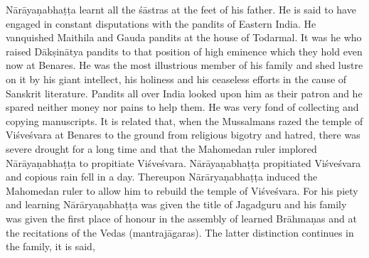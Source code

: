 \documentclass[11pt, openany]{book}
\begin{document}
Nārāyaṇabhaṭṭa learnt all the śāstras at the feet of his father. He is said to have engaged in constant disputations with the pandits of Eastern India. He vanquished Maithila and Gauda pandits at the house of Todarmal. It was he who raised Dākṣinātya pandits to that position of high eminence which they hold even now at Benares. He was the most illustrious member of his family and shed lustre on it by his giant intellect, his holiness and his ceaseless efforts in the cause of Sanskrit literature. Pandits all over India looked upon him as their patron and he spared neither money nor pains to help them. He was very fond of collecting and copying manuscripts. It is related that, when the Mussalmans razed the temple of Viśveśvara at Benares to the ground from religious bigotry and hatred, there was severe drought for a long time and that the Mahomedan ruler implored Nārāyaṇabhaṭṭa to propitiate Viśveśvara. Nārāyaṇabhaṭṭa propitiated Viśveśvara and copious rain fell in a day. Thereupon Nārāryaṇabhaṭṭa induced the Mahomedan ruler to allow him to rebuild the temple of Viśveśvara. For his piety and learning Nārāryaṇabhaṭṭa was given the title of {\qt Jagadguru} and his family was given the first place of honour in the assembly of learned Brāhmaṇas and at the recitations of the Vedas (mantrajāgaras). The latter distinction continues in the family, it is said,

\newpage
\end{document}
